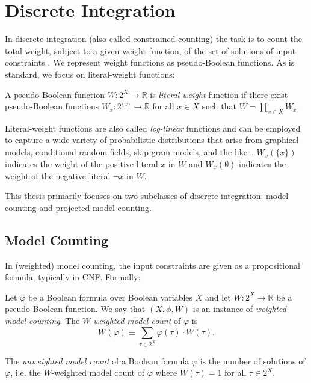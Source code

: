 \section{Discrete Integration}
\label{sec:wmc}

In discrete integration (also called constrained counting) the task is to count the total weight, subject to a given weight function, of the set of solutions of input constraints \cite{GSS08}. We represent weight functions as pseudo-Boolean functions. As is standard, we focus on literal-weight functions: 
\begin{definition}
\label{def:literal-weight}
A pseudo-Boolean function $W: 2^X \rightarrow \mathbb{R}$ is \emph{literal-weight} function if there exist pseudo-Boolean functions $W_x: 2^{\{x\}} \rightarrow \mathbb{R}$ for all $x \in X$ such that $W = \prod_{x \in X} W_x$. 
\end{definition}
Literal-weight functions are also called \emph{log-linear} functions and can be employed to capture a wide variety of probabilistic distributions that arise from graphical models, conditional random fields, skip-gram models, and the like~\cite{KF09}.
$W_x(\{x\})$ indicates the weight of the positive literal $x$ in $W$ and $W_x(\emptyset)$ indicates the weight of the negative literal $\neg x$ in $W$.

This thesis primarily focuses on two subclasses of discrete integration: model counting and projected model counting.

\subsection{Model Counting}
In (weighted) model counting, the input constraints are given as a propositional formula, typically in CNF. Formally:
\begin{definition}
  Let $\varphi$ be a Boolean formula over Boolean variables $X$ and let $W: 2^X \rightarrow \mathbb{R}$ be a pseudo-Boolean function. We say that $(X, \phi, W)$ is an instance of \emph{weighted model counting}. The \emph{$W$-weighted model count} of $\varphi$ is
  $$W(\varphi) \equiv \sum_{\tau \in 2^X} \varphi(\tau) \cdot W(\tau).$$
\end{definition}

The \emph{unweighted model count} of a Boolean formula $\varphi$ is the number of solutions of $\varphi$, i.e. the $W$-weighted model count of $\varphi$ where $W(\tau) = 1$ for all $\tau \in 2^X$.


